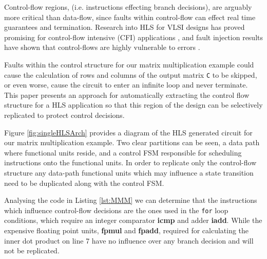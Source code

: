 Control-flow regions, (i.e. instructions effecting branch decisions), are arguably more critical
than data-flow, since faults within control-flow can effect real time guarantees
and termination.
Research into HLS for VLSI designs has proved promising for control-flow intensive
(CFI) applications \cite{chen2014reliability,chen2015reliability}, and fault injection
results have shown that control-flows are highly vulnerable to errors
\cite{saggese2005microprocessor, nakka2007processor, wong2006soft}.

Faults within the control structure for our matrix multiplication example
could cause the calculation of rows and columns of the output matrix \lstinline$C$ to be skipped,
or even worse, cause the circuit to enter an infinite loop and never terminate.
This paper presents an approach for automatically extracting the control flow structure
for a HLS application so that this region of the design can be selectively
replicated to protect control decisions.


Figure \ref{fig:singleHLSArch} provides a diagram of the HLS generated
circuit for our matrix multiplication example.
Two clear partitions can be seen, a data path where functional units reside, and a
control FSM responsible for scheduling instructions onto the functional units.
In order to replicate only the control-flow structure
any data-path functional units which may influence a state transition need to be
duplicated along with the control FSM.

Analysing the code in Listing \ref{lst:MMM} we can determine that the instructions
which influence control-flow decisions are the ones used in the \lstinline{for} loop
conditions, which require an integer comparator \textbf{icmp} and adder \textbf{iadd}.
While the expensive floating point units, \textbf{fpmul} and \textbf{fpadd}, required
for calculating the inner dot product on line 7 have no
influence over any branch decision and will not be replicated.

